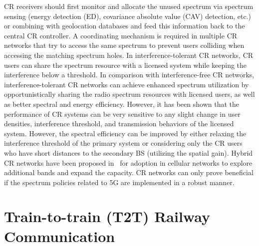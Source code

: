 CR receivers should first monitor and allocate the unused spectrum via spectrum sensing (energy detection (ED), covariance absolute value (CAV) detection, etc.) or combining with geolocation databases and feed this information back to the central CR controller. A coordinating mechanism is required in multiple CR networks that try to access the same spectrum to prevent users colliding when accessing the matching spectrum holes. In interference-tolerant CR networks, CR users can share the spectrum resource with a licensed system while keeping the interference below a threshold. In comparison with interference-free CR networks, interference-tolerant CR networks can achieve enhanced spectrum utilization by opportunistically sharing the radio spectrum resources with licensed users, as well as better spectral and energy efficiency. However, it has been shown that the performance of CR systems can be very sensitive to any slight change in user densities, interference threshold, and transmission behaviors of the licensed system. However, the spectral efficiency can be improved by either relaxing the interference threshold of the primary system or considering only the CR users who have short distances to the secondary BS (utilizing the spatial gain). Hybrid CR networks have been proposed in~\cite{hong2010capacity} for adoption in cellular networks to explore additional bands and expand the capacity. CR networks can only prove beneficial if the spectrum policies related to 5G are implemented in a robust manner. 

\section{Train-to-train (T2T) Railway Communication}

